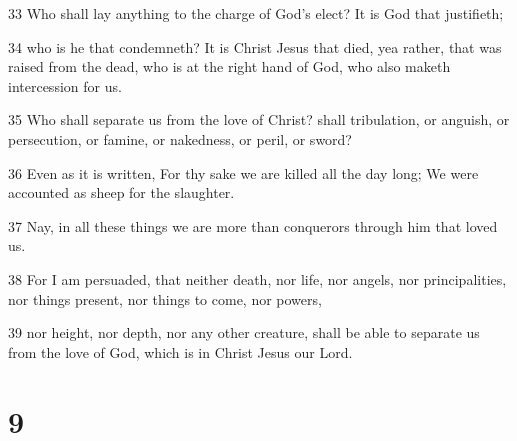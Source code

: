 \par 33 Who shall lay anything to the charge of God's elect? It is God that justifieth;
\par 34 who is he that condemneth? It is Christ Jesus that died, yea rather, that was raised from the dead, who is at the right hand of God, who also maketh intercession for us.
\par 35 Who shall separate us from the love of Christ? shall tribulation, or anguish, or persecution, or famine, or nakedness, or peril, or sword?
\par 36 Even as it is written, For thy sake we are killed all the day long; We were accounted as sheep for the slaughter.
\par 37 Nay, in all these things we are more than conquerors through him that loved us.
\par 38 For I am persuaded, that neither death, nor life, nor angels, nor principalities, nor things present, nor things to come, nor powers,
\par 39 nor height, nor depth, nor any other creature, shall be able to separate us from the love of God, which is in Christ Jesus our Lord.

\chapter{9}

